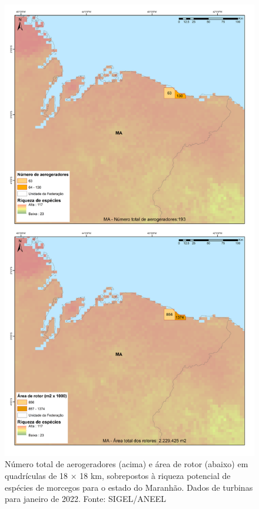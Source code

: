 \documentclass[
  oneside]{scrbook}
\begin{document}
\begin{figure}[H]

{\centering \includegraphics[width=0.7\linewidth]{imagens/cap09/Figura_9.5} 

}

\caption{Número total de aerogeradores (acima) e área de rotor (abaixo) em quadrículas de 18 × 18 km, sobrepostos à riqueza potencial de espécies de morcegos para o estado do Maranhão. Dados de turbinas para janeiro de 2022. Fonte: SIGEL/ANEEL}\label{fig:70}
\end{figure}
\end{document}
